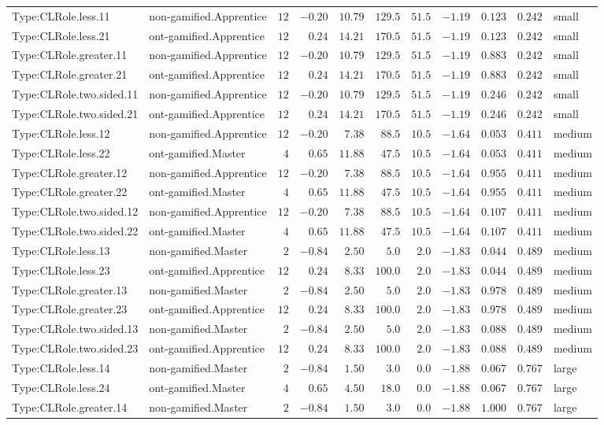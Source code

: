\documentclass[6pt,a4paper]{article}
\begin{document}
{\begin{longtable}{llrrrrrrrrl}
Type:CLRole.less.11&non-gamified.Apprentice&$12$&$-0.20$&$10.79$&$129.5$&$51.5$&$-1.19$&$0.123$&$0.242$&small\tabularnewline
Type:CLRole.less.21&ont-gamified.Apprentice&$12$&$ 0.24$&$14.21$&$170.5$&$51.5$&$-1.19$&$0.123$&$0.242$&small\tabularnewline
Type:CLRole.greater.11&non-gamified.Apprentice&$12$&$-0.20$&$10.79$&$129.5$&$51.5$&$-1.19$&$0.883$&$0.242$&small\tabularnewline
Type:CLRole.greater.21&ont-gamified.Apprentice&$12$&$ 0.24$&$14.21$&$170.5$&$51.5$&$-1.19$&$0.883$&$0.242$&small\tabularnewline
Type:CLRole.two.sided.11&non-gamified.Apprentice&$12$&$-0.20$&$10.79$&$129.5$&$51.5$&$-1.19$&$0.246$&$0.242$&small\tabularnewline
Type:CLRole.two.sided.21&ont-gamified.Apprentice&$12$&$ 0.24$&$14.21$&$170.5$&$51.5$&$-1.19$&$0.246$&$0.242$&small\tabularnewline
Type:CLRole.less.12&non-gamified.Apprentice&$12$&$-0.20$&$ 7.38$&$ 88.5$&$10.5$&$-1.64$&$0.053$&$0.411$&medium\tabularnewline
Type:CLRole.less.22&ont-gamified.Master&$ 4$&$ 0.65$&$11.88$&$ 47.5$&$10.5$&$-1.64$&$0.053$&$0.411$&medium\tabularnewline
Type:CLRole.greater.12&non-gamified.Apprentice&$12$&$-0.20$&$ 7.38$&$ 88.5$&$10.5$&$-1.64$&$0.955$&$0.411$&medium\tabularnewline
Type:CLRole.greater.22&ont-gamified.Master&$ 4$&$ 0.65$&$11.88$&$ 47.5$&$10.5$&$-1.64$&$0.955$&$0.411$&medium\tabularnewline
Type:CLRole.two.sided.12&non-gamified.Apprentice&$12$&$-0.20$&$ 7.38$&$ 88.5$&$10.5$&$-1.64$&$0.107$&$0.411$&medium\tabularnewline
Type:CLRole.two.sided.22&ont-gamified.Master&$ 4$&$ 0.65$&$11.88$&$ 47.5$&$10.5$&$-1.64$&$0.107$&$0.411$&medium\tabularnewline
Type:CLRole.less.13&non-gamified.Master&$ 2$&$-0.84$&$ 2.50$&$  5.0$&$ 2.0$&$-1.83$&$0.044$&$0.489$&medium\tabularnewline
Type:CLRole.less.23&ont-gamified.Apprentice&$12$&$ 0.24$&$ 8.33$&$100.0$&$ 2.0$&$-1.83$&$0.044$&$0.489$&medium\tabularnewline
Type:CLRole.greater.13&non-gamified.Master&$ 2$&$-0.84$&$ 2.50$&$  5.0$&$ 2.0$&$-1.83$&$0.978$&$0.489$&medium\tabularnewline
Type:CLRole.greater.23&ont-gamified.Apprentice&$12$&$ 0.24$&$ 8.33$&$100.0$&$ 2.0$&$-1.83$&$0.978$&$0.489$&medium\tabularnewline
Type:CLRole.two.sided.13&non-gamified.Master&$ 2$&$-0.84$&$ 2.50$&$  5.0$&$ 2.0$&$-1.83$&$0.088$&$0.489$&medium\tabularnewline
Type:CLRole.two.sided.23&ont-gamified.Apprentice&$12$&$ 0.24$&$ 8.33$&$100.0$&$ 2.0$&$-1.83$&$0.088$&$0.489$&medium\tabularnewline
Type:CLRole.less.14&non-gamified.Master&$ 2$&$-0.84$&$ 1.50$&$  3.0$&$ 0.0$&$-1.88$&$0.067$&$0.767$&large\tabularnewline
Type:CLRole.less.24&ont-gamified.Master&$ 4$&$ 0.65$&$ 4.50$&$ 18.0$&$ 0.0$&$-1.88$&$0.067$&$0.767$&large\tabularnewline
Type:CLRole.greater.14&non-gamified.Master&$ 2$&$-0.84$&$ 1.50$&$  3.0$&$ 0.0$&$-1.88$&$1.000$&$0.767$&large\tabularnewline

\end{longtable}}
\end{document}
